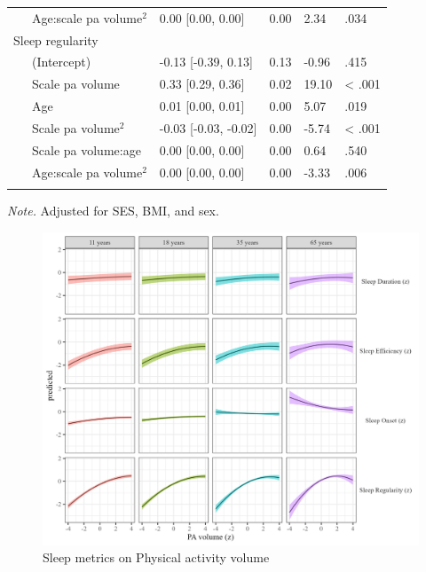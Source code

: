 \documentclass[
  man]{apa6}
\begin{document}
\begin{table}[tbp]
\begin{center}
\begin{threeparttable}
\begin{tabular}{lllll}
\ \ \ Age:scale  pa  volume$^2$ & 0.00 [0.00, 0.00] & 0.00 & 2.34 & .034\\
Sleep regularity &  &  &  & \\
\ \ \ (Intercept) & -0.13 [-0.39, 0.13] & 0.13 & -0.96 & .415\\
\ \ \ Scale  pa  volume & 0.33 [0.29, 0.36] & 0.02 & 19.10 & < .001\\
\ \ \ Age & 0.01 [0.00, 0.01] & 0.00 & 5.07 & .019\\
\ \ \ Scale  pa  volume$^2$ & -0.03 [-0.03, -0.02] & 0.00 & -5.74 & < .001\\
\ \ \ Scale  pa  volume:age & 0.00 [0.00, 0.00] & 0.00 & 0.64 & .540\\
\ \ \ Age:scale  pa  volume$^2$ & 0.00 [0.00, 0.00] & 0.00 & -3.33 & .006\\
\bottomrule
\addlinespace
\end{tabular}

\begin{tablenotes}[para]
\normalsize{\textit{Note.} Adjusted for SES, BMI, and sex. }
\end{tablenotes}

\end{threeparttable}
\end{center}

\end{table}

\begin{figure}
\includegraphics[width=7.08in]{../Figures/sleep on pa_volume} \caption{Sleep metrics on Physical activity volume}\label{fig:sleep-by-volume-fig}
\end{figure}
\end{document}
